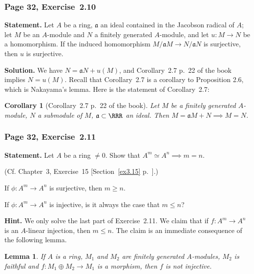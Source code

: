 \documentclass[12pt,letterpaper]{article}%
\newcommand{\mf}{\mathfrak}
\newcommand{\aaa}{\mf a}
\newcommand{\mmm}{\mf m}
\newcommand{\nn}{\noindent}
\newtheorem{cor}[thm]{Corollary}
\newtheorem{lem}[thm]{Lemma}
\begin{document}
\subsubsection{Page 32, Exercise~2.10}%

\textbf{Statement.} Let $A$ be a ring, $\aaa$ an ideal contained in the Jacobson radical of $A$; let $M$ be an $A$-module and $N$ a finitely generated $A$-module, and let $u:M\to N$ be a homomorphism. If the induced homomorphism $M/\aaa M\to N/\aaa N$ is surjective, then $u$ is surjective.

\nn\textbf{Solution.} We have $N=\aaa N+u(M)$, and Corollary~2.7 p.~22 of the book implies $N=u(M)$. Recall that Corollary~2.7 is a corollary to Proposition 2.6, which is Nakayama's lemma. Here is the statement of Corollary~2.7:
\begin{cor}[Corollary~2.7 p.~22 of the book]
Let $M$ be a finitely generated $A$-module, $N$ a submodule of $M$, $\aaa\subset\RRR$ an ideal. Then $M=\aaa M+N\implies M=N$.
\end{cor}

\subsubsection{Page 32, Exercise~2.11}%

\textbf{Statement.} Let $A$ be a ring $\ne0$. Show that $A^m\simeq A^n\implies m=n$.

\nn[Let $\mmm$ be a maximal ideal of $A$ and let $\phi:A^m\to A^n$ be an isomorphism. Then $1\otimes\phi:(A/\mmm)\otimes_A^m\to(A/\mmm)\otimes_A^n$ is an isomorphism between vector spaces of dimensions $m$ and $n$ over the field $k=A/\mmm$. Hence $m=n$.] (Cf. Chapter~3, Exercise~15 [Section~\ref{ex3.15} p.~\pageref{ex3.15}].)

If $\phi:A^m\to A^n$ is surjective, then $m\ge n$.

If $\phi:A^m\to A^n$ is injective, is it always the case that $m\le n$?

\nn\textbf{Hint.} We only solve the last part of Exercise~2.11. We claim that if $f:A^m\to A^n$ is an $A$-linear injection, then $m\le n$. The claim is an immediate consequence of the following lemma.

\begin{lem}
If $A$ is a ring, $M_1$ and $M_2$ are finitely generated $A$-modules, $M_2$ is faithful and $f:M_1\oplus M_2\to M_1$ is a morphism, then $f$ is not injective.
\end{lem}
\end{document}
